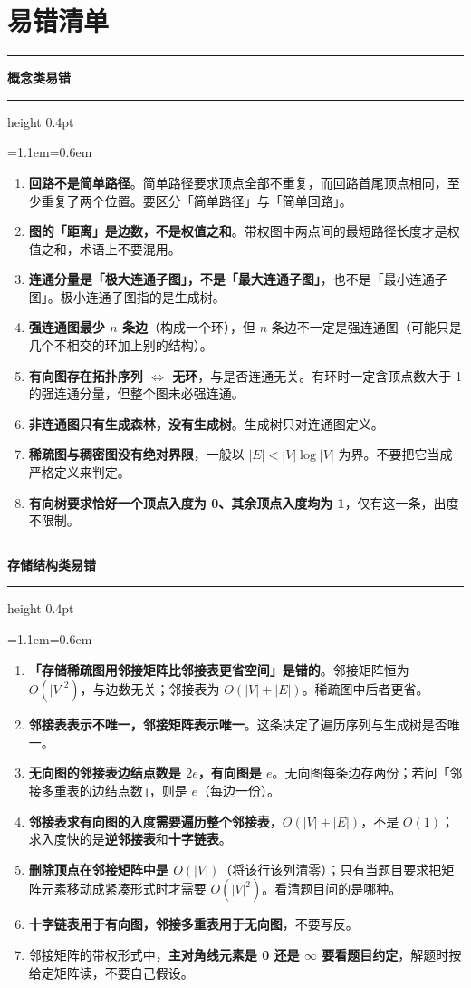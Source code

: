 \documentclass[11pt,openany,UTF8]{ctexbook}
\newcommand{\callouthead}[2]{%
  \par\addvspace{7pt}\noindent
  {\color{#1}\rule[-0.15em]{3pt}{1.05em}}\hspace{0.5em}%
  {\bfseries\color{#1}#2}\par\nobreak\vspace{-0.35em}%
  {\color{rulesep}\hrule height 0.4pt}\nobreak\vspace{0.45em}%
  \begingroup\small\setlength{\parindent}{0pt}%
  \leftskip=1.1em\rightskip=0.6em\noindent\ignorespaces}
\newcommand{\calloutend}{\par\endgroup\addvspace{7pt}}
\newenvironment{callwarn}[1]{\callouthead{warnbar}{#1}}{\calloutend}
\begin{document}
\section*{易错清单}

\begin{callwarn}{概念类易错}
\begin{enumerate}
\item \textbf{回路不是简单路径}。简单路径要求顶点全部不重复，而回路首尾顶点相同，至少重复了两个位置。要区分「简单路径」与「简单回路」。
\item \textbf{图的「距离」是边数，不是权值之和}。带权图中两点间的最短路径长度才是权值之和，术语上不要混用。
\item \textbf{连通分量是「极大连通子图」，不是「最大连通子图」}，也不是「最小连通子图」。极小连通子图指的是生成树。
\item \textbf{强连通图最少 $n$ 条边}（构成一个环），但 $n$ 条边不一定是强连通图（可能只是几个不相交的环加上别的结构）。
\item \textbf{有向图存在拓扑序列 $\Leftrightarrow$ 无环}，与是否连通无关。有环时一定含顶点数大于 1 的强连通分量，但整个图未必强连通。
\item \textbf{非连通图只有生成森林，没有生成树}。生成树只对连通图定义。
\item \textbf{稀疏图与稠密图没有绝对界限}，一般以 $|E|<|V|\log|V|$ 为界。不要把它当成严格定义来判定。
\item \textbf{有向树要求恰好一个顶点入度为 0、其余顶点入度均为 1}，仅有这一条，出度不限制。
\end{enumerate}
\end{callwarn}

\begin{callwarn}{存储结构类易错}
\begin{enumerate}
\item \textbf{「存储稀疏图用邻接矩阵比邻接表更省空间」是错的}。邻接矩阵恒为 $O(|V|^{2})$，与边数无关；邻接表为 $O(|V|+|E|)$。稀疏图中后者更省。
\item \textbf{邻接表表示不唯一，邻接矩阵表示唯一}。这条决定了遍历序列与生成树是否唯一。
\item \textbf{无向图的邻接表边结点数是 $2e$，有向图是 $e$}。无向图每条边存两份；若问「邻接多重表的边结点数」，则是 $e$（每边一份）。
\item \textbf{邻接表求有向图的入度需要遍历整个邻接表}，$O(|V|+|E|)$，不是 $O(1)$；求入度快的是\textbf{逆邻接表}和\textbf{十字链表}。
\item \textbf{删除顶点在邻接矩阵中是 $O(|V|)$}（将该行该列清零）；只有当题目要求把矩阵元素移动成紧凑形式时才需要 $O(|V|^{2})$。看清题目问的是哪种。
\item \textbf{十字链表用于有向图，邻接多重表用于无向图}，不要写反。
\item 邻接矩阵的带权形式中，\textbf{主对角线元素是 0 还是 $\infty$ 要看题目约定}，解题时按给定矩阵读，不要自己假设。
\end{enumerate}
\end{callwarn}
\end{document}

